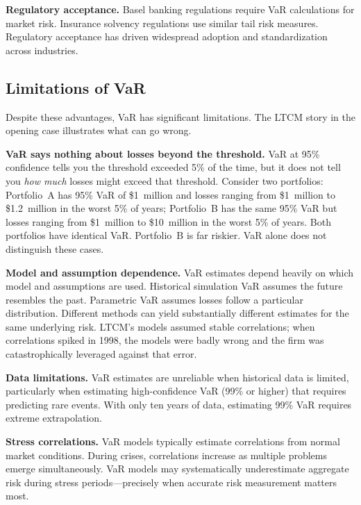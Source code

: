 \documentclass[11pt,openany]{book}
\begin{document}
\textbf{Regulatory acceptance.} Basel banking regulations require VaR
calculations for market risk. Insurance solvency regulations use similar tail
risk measures. Regulatory acceptance has driven widespread adoption and
standardization across industries.

\subsection{Limitations of VaR}
\label{subsec:var-limits}

Despite these advantages, VaR has significant limitations. The LTCM story in
the opening case illustrates what can go wrong.

\textbf{VaR says nothing about losses beyond the threshold.} VaR at 95\%
confidence tells you the threshold exceeded 5\% of the time, but it does not
tell you \emph{how much} losses might exceed that threshold. Consider two
portfolios: Portfolio~A has 95\% VaR of \$1~million and losses ranging from
\$1~million to \$1.2~million in the worst 5\% of years; Portfolio~B has the
same 95\% VaR but losses ranging from \$1~million to \$10~million in the worst
5\% of years. Both portfolios have identical VaR. Portfolio~B is far riskier.
VaR alone does not distinguish these cases.

\textbf{Model and assumption dependence.} VaR estimates depend heavily on
which model and assumptions are used. Historical simulation VaR assumes the
future resembles the past. Parametric VaR assumes losses follow a particular
distribution. Different methods can yield substantially different estimates for
the same underlying risk. LTCM's models assumed stable correlations; when
correlations spiked in 1998, the models were badly wrong and the firm was
catastrophically leveraged against that error.

\textbf{Data limitations.} VaR estimates are unreliable when historical data is
limited, particularly when estimating high-confidence VaR (99\% or higher) that
requires predicting rare events. With only ten years of data, estimating 99\%
VaR requires extreme extrapolation.

\textbf{Stress correlations.} VaR models typically estimate correlations from
normal market conditions. During crises, correlations increase as multiple
problems emerge simultaneously. VaR models may systematically underestimate
aggregate risk during stress periods---precisely when accurate risk measurement
matters most.
\end{document}

